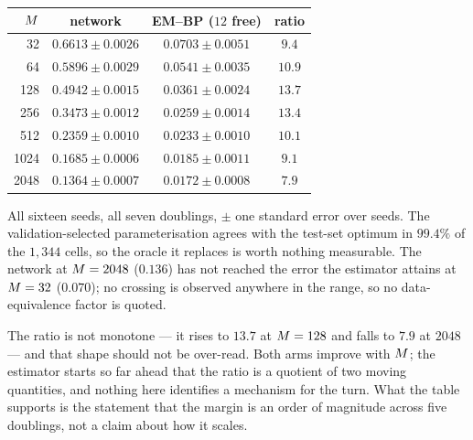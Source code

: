 \begin{center}\small
\begin{tabular}{@{}rccc@{}}
\toprule
$M$ & network & EM--BP ($12$ free) & ratio \\
\midrule
32   & $0.6613 \pm 0.0026$ & $\mathbf{0.0703 \pm 0.0051}$ & $9.4$ \\
64   & $0.5896 \pm 0.0029$ & $\mathbf{0.0541 \pm 0.0035}$ & $10.9$ \\
128  & $0.4942 \pm 0.0015$ & $\mathbf{0.0361 \pm 0.0024}$ & $13.7$ \\
256  & $0.3473 \pm 0.0012$ & $\mathbf{0.0259 \pm 0.0014}$ & $13.4$ \\
512  & $0.2359 \pm 0.0010$ & $\mathbf{0.0233 \pm 0.0010}$ & $10.1$ \\
1024 & $0.1685 \pm 0.0006$ & $\mathbf{0.0185 \pm 0.0011}$ & $9.1$ \\
2048 & $0.1364 \pm 0.0007$ & $\mathbf{0.0172 \pm 0.0008}$ & $7.9$ \\
\bottomrule
\end{tabular}
\end{center}

All sixteen seeds, all seven doublings, $\pm$ one standard error over seeds. The
validation-selected parameterisation agrees with the test-set optimum in $99.4\%$ of the $1{,}344$
cells, so the oracle it replaces is worth nothing measurable. The network at $M=2048$
($0.136$) has not reached the error the estimator attains at $M=32$ ($0.070$); no crossing is
observed anywhere in the range, so no data-equivalence factor is quoted.

The ratio is not monotone --- it rises to $13.7$ at $M=128$ and falls to $7.9$ at $2048$ ---
and that shape should not be over-read. Both arms improve with $M$; the estimator starts so
far ahead that the ratio is a quotient of two moving quantities, and nothing here identifies a
mechanism for the turn. What the table supports is the statement that the margin is an order of
magnitude across five doublings, not a claim about how it scales.

